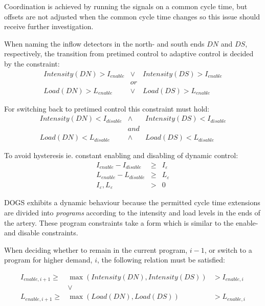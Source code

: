 Coordination is achieved by running the signals on a common cycle time, but offsets are not adjusted when the common cycle time changes so this issue should receive further investigation.

When naming the inflow detectors in the north- and south ends $DN$ and $DS$, respectively, the transition from pretimed control to adaptive control is decided by the constraint:
\begin{eqnarray*}
Intensity(DN) > I_{enable} & \vee & Intensity(DS) > I_{enable} \\
& or & \\
Load(DN) > L_{enable} & \vee & Load(DS) > L_{enable}
\end{eqnarray*}

For switching back to pretimed control this constraint must hold:
\begin{eqnarray*}
Intensity(DN) < I_{disable} & \wedge & Intensity(DS) < I_{disable} \\
& and & \\
Load(DN) < L_{disable} & \wedge & Load(DS) < L_{disable}
\end{eqnarray*}

To avoid hysteresis ie. constant enabling and disabling of dynamic control:
\begin{eqnarray}
I_{enable} - I_{disable} & \geq & I_{\varepsilon} \label{eqn:hysteresis_intensity} \\ 
L_{enable} - L_{disable} & \geq & L_{\varepsilon} \label{eqn:hysteresis_load} \\
I_{\varepsilon},L_{\varepsilon} & > & 0 \label{eqn:hysteresis_limits}
\label{eqn:hysteresis}
\end{eqnarray}

DOGS exhibits a dynamic behaviour because the permitted cycle time extensions are divided into \textit{programs} according to the intensity and load levels in the ends of the artery. These program constraints take a form which is similar to the enable- and disable constraints.

When deciding whether to remain in the current program, $i-1$, or switch to a program for higher demand, $i$, the following relation must be satisfied:

\begin{eqnarray*}
I_{enable,i+1} \geq & \max(Intensity(DN),Intensity(DS)) & > I_{enable,i} \\
& \vee & \\
L_{enable,i+1} \geq & \max(Load(DN),Load(DS))  & > L_{enable,i}
\end{eqnarray*}

